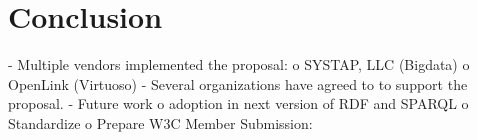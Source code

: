 \section{Conclusion} \label{Section:Conclusion}
-	Multiple vendors implemented the proposal:
o	SYSTAP, LLC (Bigdata)
o	OpenLink (Virtuoso)
-	Several organizations have agreed to to support the proposal.
-	Future work
o	adoption in next version of RDF and SPARQL
o	Standardize
o	Prepare W3C Member Submission:

